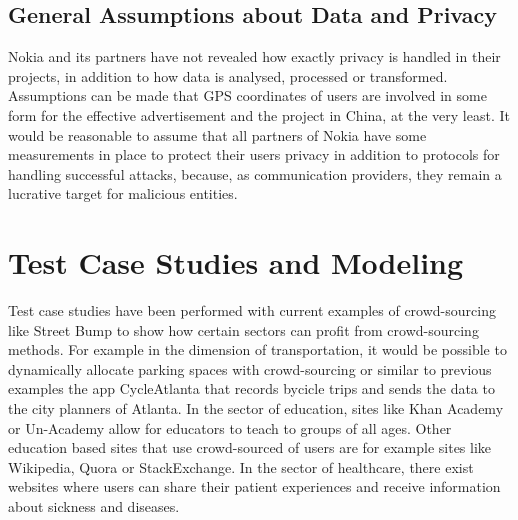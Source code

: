 \documentclass[a4paper,12pt]{report}
\begin{document}
		\subsection{General Assumptions about Data and Privacy}
		\startsubsection
		Nokia and its partners have not revealed how exactly privacy is handled in their projects, in addition to how data is analysed, processed or transformed. Assumptions can be made that GPS coordinates of users are involved in some form for the effective advertisement and the project in China, at the very least. It would be reasonable to assume that all partners of Nokia have some measurements in place to protect their users privacy in addition to protocols for handling successful attacks, because, as communication providers, they remain a lucrative target for malicious entities.
		\closesection		
	\closesection
	
	\section[Test Case Studies and Modeling]{Test Case Studies and Modeling \cite{CrowdSourcing}}
	\startsection
		Test case studies have been performed with current examples of crowd-sourcing like Street Bump to show how certain sectors can profit from crowd-sourcing methods. For example in the dimension of transportation, it would be possible to dynamically allocate parking spaces with crowd-sourcing or similar to previous examples the app CycleAtlanta that records bycicle trips and sends the data to the city planners of Atlanta. In the sector of education, sites like Khan Academy or Un-Academy allow for educators to teach to groups of all ages. Other education based sites that use crowd-sourced of users are for example sites like Wikipedia, Quora or StackExchange. In the sector of healthcare, there exist websites where users can share their patient experiences and receive information about sickness and diseases.
	\closesection
\end{document}
